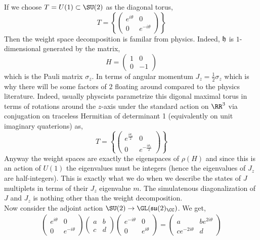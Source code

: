 \documentclass[12pt]{article}
\begin{document}
If we choose $T = U(1) \subset \SU(2)$ as the diagonal torus,
\[ T = \left\{ 
\begin{pmatrix}
e^{i \theta} & 0
\\
0 & e^{-i\theta} 
\end{pmatrix} \right\} \]
Then the weight space decomposition is familar from physics. Indeed, $\mathfrak{h}$ is $1$-dimensional generated by the matrix,
\[ H = \begin{pmatrix}
1 & 0 
\\
0 & -1 
\end{pmatrix} \]
which is the Pauli matrix $\sigma_z$. In terms of angular momentum $J_z = \tfrac{1}{2} \sigma_z$ which is why there will be some factors of $2$ floating around compared to the physics literature. Indeed, usually physcists parametrize this digonal maximal torus in terms of rotations around the $z$-axis under the standard action on $\RR^3$ via conjugation on traceless Hermitian of determinant 1 (equivalently on unit imaginary quaterions) as,
\[ T = \left\{ 
\begin{pmatrix}
e^{\frac{i \theta_z}{2}} & 0
\\
0 & e^{-\frac{i \theta_z}{2}} 
\end{pmatrix} \right\} \]
Anyway the weight spaces are exactly the eigenspaces of $\rho(H)$ and since this is an action of $U(1)$ the eigenvalues must be integers (hence the eigenvalues of $J_z$ are half-integers). This is exactly what we do when we describe the states of $J$ multiplets in terms of their $J_z$ eigenvalue $m$. The simulatenous diagonalization of $J$ and $J_z$ is nothing other than the weight decomposition. 
\bigskip\\
Now consider the adjoint action $\SU(2) \to \GL(\su(2)_{\CC})$. We get,
\begin{align*}
\begin{pmatrix}
e^{i \theta} & 0
\\
0 & e^{-i\theta} 
\end{pmatrix}
\begin{pmatrix}
a & b
\\
c & d
\end{pmatrix}
\begin{pmatrix}
e^{-i \theta} & 0
\\
0 & e^{i\theta} 
\end{pmatrix}
= 
\begin{pmatrix}
a & b e^{2i \theta}
\\
c e^{-2i \theta} & d
\end{pmatrix}
\end{align*} 
\end{document}
